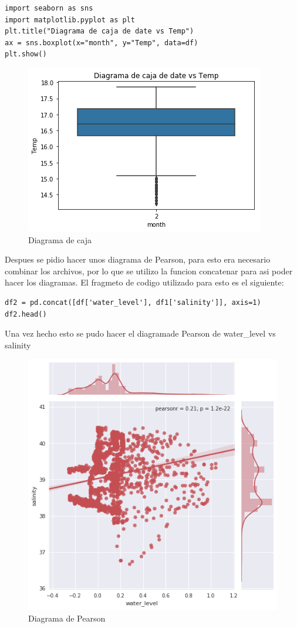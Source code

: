 \documentclass{article}
\begin{document}
\begin{verbatim}
import seaborn as sns
import matplotlib.pyplot as plt
plt.title("Diagrama de caja de date vs Temp")
ax = sns.boxplot(x="month", y="Temp", data=df)
plt.show()
\end{verbatim}

\begin{figure}[h]
\centering
\includegraphics[scale=0.5]{diagrama2.png}
\caption{Diagrama de caja}
\end{figure}

Despues se pidio hacer unos diagrama de Pearson, para esto era necesario combinar los archivos, por lo que se utilizo la funcion concatenar para asi poder hacer los diagramas.
El fragmeto de codigo utilizado para esto es el siguiente:
\begin{verbatim}
df2 = pd.concat([df['water_level'], df1['salinity']], axis=1)
df2.head()
\end{verbatim}

Una vez hecho esto se pudo hacer el diagramade Pearson de water\_level vs salinity

\begin{figure}[h]
\centering
\includegraphics[scale=0.5]{pearson1.png}
\caption{Diagrama de Pearson}
\end{figure}
\end{document}
